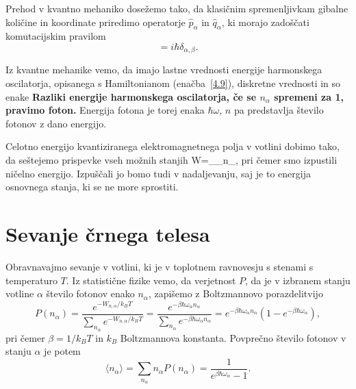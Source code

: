 Prehod v kvantno mehaniko dosežemo tako, da klasičnim spremenljivkam gibalne količine
in koordinate priredimo operatorje $\hat{p}_{\alpha}$ in $\hat{q}_{\alpha}$,
ki morajo zadoščati komutacijskim pravilom 
\begin{equation}
[\hat{q}_{\alpha},\hat{p}_{\beta}]=i\hbar \delta_{\alpha, \beta}.
\label{4.10}
\end{equation}

Iz kvantne mehanike vemo, da imajo lastne vrednosti energije harmonskega oscilatorja, 
opisanega s Hamiltonianom (enačba~\ref{4.9}), diskretne vrednosti in so enake
{\bf Razliki energije harmonskega oscilatorja, če se $n_{\alpha}$
spremeni za 1, pravimo foton.} Energija
fotona je torej enaka $\hbar \omega$, $n$ pa predstavlja število fotonov z dano energijo. 

Celotno energijo kvantiziranega elektromagnetnega polja v votlini
dobimo tako, da seštejemo prispevke vseh možnih stanjih
\beq
W=\sum_{\alpha}\hbar\omega_{\alpha}n_{\alpha},
\eeq
pri čemer smo izpustili ničelno energijo. Izpuščali jo bomo tudi v nadaljevanju, saj
je to energija osnovnega stanja, ki se ne more sprostiti. 

\section{Sevanje črnega telesa}

Obravnavajmo sevanje v votlini, ki je v toplotnem ravnovesju s stenami s temperaturo
$T$. Iz statistične fizike vemo, da verjetnost $P$, da je v izbranem stanju 
votline $\alpha$ število fotonov enako $n_{\alpha}$, zapišemo z Boltzmannovo porazdelitvijo
\begin{equation}
P(n_{\alpha})=\frac{e^{-W_{n,\alpha}/k_BT}}{\sum_{n_{\alpha}}e^{-W_{n,\alpha}/k_BT}} = 
\frac{e^{-\beta\hbar\omega_{\alpha}n_{\alpha}}}
{\sum_{n_{\alpha}}e^{-\beta\hbar\omega_{\alpha}n_{\alpha}}}=
e^{-\beta\hbar\omega_{\alpha}n_{\alpha}}(1-e^{-\beta\hbar\omega_{\alpha}}),
\label{4.12}
\end{equation}
pri čemer $\beta = 1/k_BT$ in $k_B$ Boltzmannova konstanta. Povprečno število fotonov 
v stanju $\alpha$ je potem
\begin{equation}
\langle n_{\alpha}\rangle =\sum_{n_{\alpha}}n_{\alpha}P(n_{\alpha})=\frac{1}{e^{\beta\hbar\omega_{\alpha}}-1}.
\label{4.13}
\end{equation}


